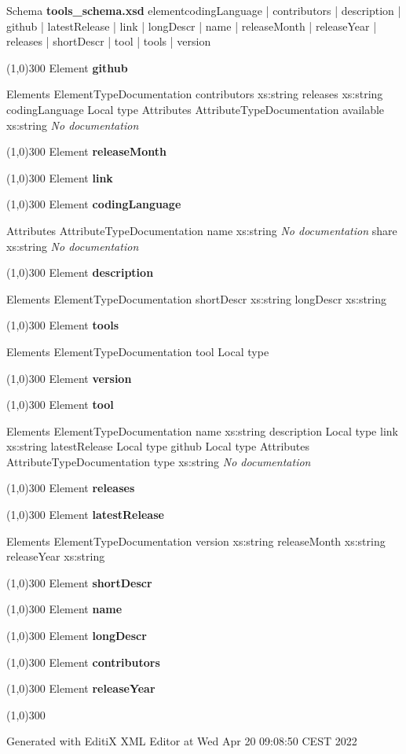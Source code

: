 \thispagestyle{empty}
{


Schema \textbf{tools\_schema.xsd
 }
 elementcodingLanguage | contributors | description | github | latestRelease | link | longDescr | name | releaseMonth | releaseYear | releases | shortDescr | tool | tools | version

\line(1,0){300}
Element
 \textbf{
 github
 }
 
 Elements
 ElementTypeDocumentation
 contributors
 xs:string
 \textit{}
 releases
 xs:string
 \textit{}
 codingLanguage
 Local type
 \textit{}
 Attributes
 AttributeTypeDocumentation
 available
 xs:string
 \textit{
 No documentation
 }

\line(1,0){300}
Element
 \textbf{
 releaseMonth
 }

\line(1,0){300}
Element
 \textbf{
 link
 }

\line(1,0){300}
Element
 \textbf{
 codingLanguage
 }
 
 Attributes
 AttributeTypeDocumentation
 name
 xs:string
 \textit{
 No documentation
 }
 share
 xs:string
 \textit{
 No documentation
 }

\line(1,0){300}
Element
 \textbf{
 description
 }
 
 Elements
 ElementTypeDocumentation
 shortDescr
 xs:string
 \textit{}
 longDescr
 xs:string
 \textit{}

\line(1,0){300}
Element
 \textbf{
 tools
 }
 
 Elements
 ElementTypeDocumentation
 tool
 Local type
 \textit{}

\line(1,0){300}
Element
 \textbf{
 version
 }

\line(1,0){300}
Element
 \textbf{
 tool
 }
 
 Elements
 ElementTypeDocumentation
 name
 xs:string
 \textit{}
 description
 Local type
 \textit{}
 link
 xs:string
 \textit{}
 latestRelease
 Local type
 \textit{}
 github
 Local type
 \textit{}
 Attributes
 AttributeTypeDocumentation
 type
 xs:string
 \textit{
 No documentation
 }

\line(1,0){300}
Element
 \textbf{
 releases
 }

\line(1,0){300}
Element
 \textbf{
 latestRelease
 }
 
 Elements
 ElementTypeDocumentation
 version
 xs:string
 \textit{}
 releaseMonth
 xs:string
 \textit{}
 releaseYear
 xs:string
 \textit{}

\line(1,0){300}
Element
 \textbf{
 shortDescr
 }

\line(1,0){300}
Element
 \textbf{
 name
 }

\line(1,0){300}
Element
 \textbf{
 longDescr
 }

\line(1,0){300}
Element
 \textbf{
 contributors
 }

\line(1,0){300}
Element
 \textbf{
 releaseYear
 }

\line(1,0){300}



{\centering{}Generated with EditiX XML Editor at Wed Apr 20 09:08:50 CEST 2022\par}

\clearpage


}
